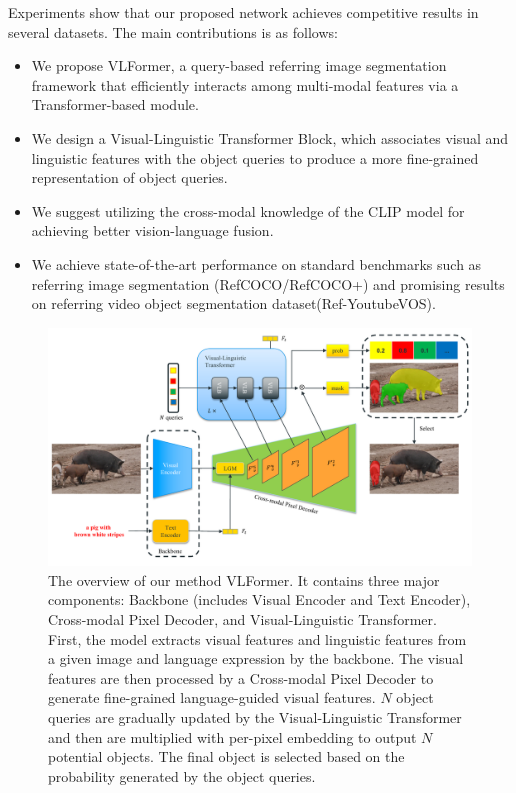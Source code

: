 Experiments show that our proposed network achieves competitive results in several datasets. The main contributions is as follows:
\begin{itemize}
    \item We propose VLFormer, a query-based referring image segmentation framework that efficiently interacts among multi-modal features via a Transformer-based module.
    \item We design a Visual-Linguistic Transformer Block, which associates visual and linguistic features with the object queries to produce a more fine-grained representation of object queries. 
    \item We suggest utilizing the cross-modal knowledge of the CLIP model for achieving better vision-language fusion.
    \item We achieve state-of-the-art performance on standard benchmarks such as referring image segmentation (RefCOCO/RefCOCO+) and promising results on referring video object segmentation dataset(Ref-YoutubeVOS).
\end{itemize}

\begin{figure}[H]
    \centering
    \includegraphics[width=\textwidth]{content/resources/images/referring_segmentation/NewVLFormer.pdf}
    \caption{The overview of our method VLFormer. It contains three major components: Backbone (includes Visual Encoder and Text Encoder), Cross-modal Pixel Decoder, and Visual-Linguistic Transformer. First, the model extracts visual features and linguistic features from a given image and language expression by the backbone. The visual features are then processed by a Cross-modal Pixel Decoder to generate fine-grained language-guided visual features. $N$ object queries are gradually updated by the Visual-Linguistic Transformer and then are multiplied with per-pixel embedding to output $N$ potential objects. The final object is selected based on the probability generated by the object queries.}
    \label{fig:VLFormer}
\end{figure}